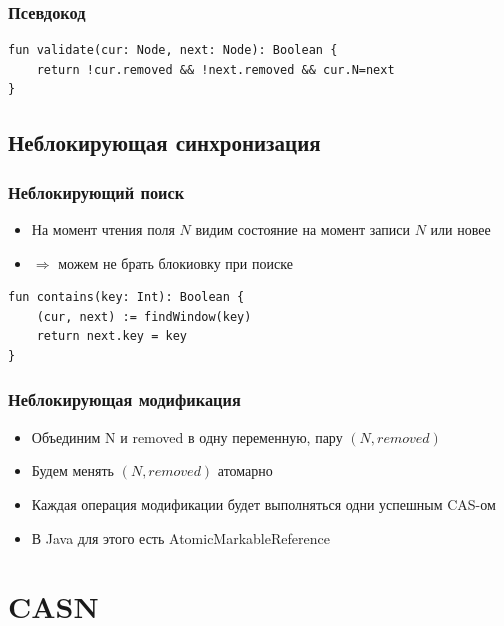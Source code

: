 \documentclass[10pt,a4paper,oneside,titlepage]{article}
\theoremstyle{plain}
\theoremstyle{defenition}
\begin{document}
\subsubsection{Псевдокод}

\begin{lstlisting}
fun validate(cur: Node, next: Node): Boolean {
    return !cur.removed && !next.removed && cur.N=next
}
\end{lstlisting}

\subsection{Неблокирующая синхронизация}

\subsubsection{Неблокирующий поиск}

\begin{itemize}
	\item На момент чтения поля $N$ видим состояние на момент записи $N$ или новее
	\item $\Rightarrow$ можем не брать блокиовку при поиске
\end{itemize}

\begin{lstlisting}
fun contains(key: Int): Boolean {
    (cur, next) := findWindow(key)
    return next.key = key
}
\end{lstlisting}

\subsubsection{Неблокирующая модификация}

\begin{itemize}
	\item Объединим N и removed в одну переменную, пару $(N, removed)$
	\item Будем менять $(N, removed)$ атомарно
	\item Каждая операция модификации будет выполняться одни успешным CAS-ом
	\item В Java для этого есть AtomicMarkableReference
\end{itemize}


\section{CASN}
\end{document}
